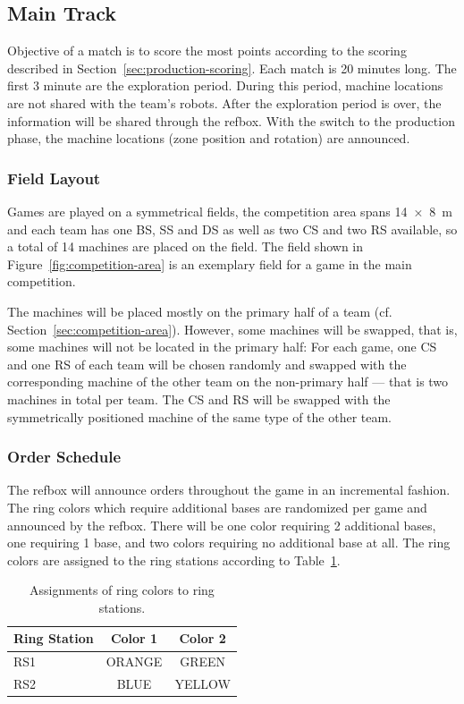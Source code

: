 \documentclass[12pt,twoside]{article}
\newcommand{\refsec}[1]{Section~\ref{#1}}
\newcommand{\reffig}[1]{Figure~\ref{#1}}
\newcommand{\reftab}[1]{Table~\ref{#1}}
\begin{document}
\subsection{Main Track}
\label{sec:tournament-main}
Objective of a match is to score the most points according to the scoring
described in \refsec{sec:production-scoring}.
Each match is 20 minutes long. The first 3 minute are the exploration period.
During this period, machine locations are not shared with the team's robots.
After the exploration period is over, the information will be shared through
the \ac{refbox}.
With the switch to the production phase, the machine locations (zone position
and rotation) are announced.

\subsubsection{Field Layout}
Games are played on a symmetrical fields, the competition area spans
\SI{14 x 8}{\metre} and each team has one \ac{BS}, \ac{SS} %
and \ac{DS} as well as  two \ac{CS} and two \ac{RS} available,
so a total of 14 machines are placed on the field.
The field shown in \reffig{fig:competition-area} is an exemplary field for
a game in the main competition.

The machines will be placed mostly on the primary half
of a team (cf. \refsec{sec:competition-area}). However, some machines will be
swapped, that is, some machines will not be located in the primary
half:
For each game, one \ac{CS} and one \ac{RS} of each team will be chosen randomly
and swapped with the corresponding machine of the other team on the
non-primary half --- that is two machines in total per team. The \ac{CS} and
\ac{RS} will be swapped with the symmetrically positioned machine of the
same type of the other team.

\subsubsection{Order Schedule}
The \ac{refbox} will announce orders throughout the game in an
incremental fashion.
The ring colors which
require additional bases are randomized per game and announced by the
refbox. There will be one color requiring 2 additional bases, one
requiring 1 base, and two colors requiring no additional base at
all. The ring colors are assigned to the ring stations according to
\reftab{tab:main-track-ring-color-assignment}.

\begin{table}
\begin{tabular}{l||c|c}
  \bf{Ring Station} & \bf{Color 1} & \bf{Color 2} \\\hline
  RS1 & ORANGE & GREEN \\
  RS2 & BLUE & YELLOW
\end{tabular}
\caption{Assignments of ring colors to ring stations.}
\label{tab:main-track-ring-color-assignment}
\end{table}
\end{document}
